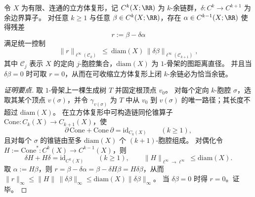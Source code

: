 \begin{proposition}[离散广义斯托克斯的可积化校正]\label{prop:conclusion-discrete-stokes-integrable-correction}
令 \(X\) 为有限、连通的立方体复形，记 \(C^k(X;\RR)\) 为 \(k\)-余链群，\(\delta:C^k\to C^{k+1}\) 为余边界算子。
对任意 \(k\ge 1\) 与任意 \(\beta\in C^k(X;\RR)\)，存在 \(\alpha\in C^{k-1}(X;\RR)\) 使得残差
\[
r:=\beta-\delta\alpha
\]
满足统一控制
\[
\|r\|_{\ell^\infty(\mathcal C_k)}\ \le\ \mathrm{diam}(X)\,\|\delta\beta\|_{\ell^\infty(\mathcal C_{k+1})},
\]
其中 \(\mathcal C_j\) 表示 \(X\) 的定向 \(j\)-胞腔集合，\(\mathrm{diam}(X)\) 为 \(1\)-骨架的图距离直径。
并且当 \(\delta\beta=0\) 时可取 \(r=0\)，从而在可收缩立方体复形上闭 \(k\)-余链必为恰当余链。
\end{proposition}
\begin{proof}[证明要点]
取 \(1\)-骨架上一棵生成树 \(T\) 并固定根顶点 \(v_0\)。
对每个定向 \(k\)-胞腔 \(\sigma\)，选取其某个顶点 \(v(\sigma)\)，并令 \(\gamma_{v(\sigma)}\) 为 \(T\) 中从 \(v_0\) 到 \(v(\sigma)\) 的唯一路径；其长度不超过 \(\mathrm{diam}(X)\)。
在立方体复形中可构造链同伦锥算子 \(\mathrm{Cone}:C_k(X)\to C_{k+1}(X)\)，使
\[
\partial\,\mathrm{Cone}+\mathrm{Cone}\,\partial=\mathrm{id}_{C_k(X)}\qquad(k\ge 1),
\]
且对每个 \(\sigma\) 的锥链由至多 \(\mathrm{diam}(X)\) 个 \((k+1)\)-胞腔组成。
对偶化令 \(H:=\mathrm{Cone}^\ast:C^k(X)\to C^{k-1}(X)\)，则
\[
\delta H+H\delta=\mathrm{id}_{C^k(X)}\qquad(k\ge 1),
\qquad
\|H\|_{\ell^\infty\to\ell^\infty}\le \mathrm{diam}(X).
\]
取 \(\alpha:=H\beta\)，则
\(
r=\beta-\delta\alpha=\beta-\delta H\beta=H\delta\beta
\)，从而
\(
\|r\|_\infty\le \|H\|\,\|\delta\beta\|_\infty\le \mathrm{diam}(X)\|\delta\beta\|_\infty
\)。
当 \(\delta\beta=0\) 时得 \(r=0\)。证毕。
\end{proof}

